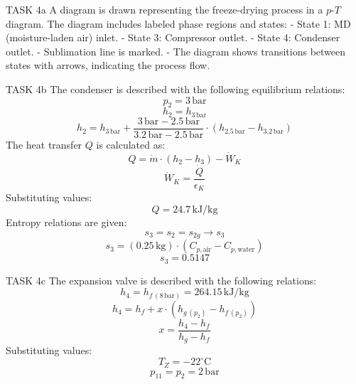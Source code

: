 TASK 4a  
A diagram is drawn representing the freeze-drying process in a \( p \)-\( T \) diagram. The diagram includes labeled phase regions and states:  
- State 1: MD (moisture-laden air) inlet.  
- State 3: Compressor outlet.  
- State 4: Condenser outlet.  
- Sublimation line is marked.  
- The diagram shows transitions between states with arrows, indicating the process flow.  

TASK 4b  
The condenser is described with the following equilibrium relations:  
\[
p_2 = 3 \, \text{bar}
\]
\[
h_2 = h_{3 \, \text{bar}}
\]
\[
h_2 = h_{3 \, \text{bar}} + \frac{3 \, \text{bar} - 2.5 \, \text{bar}}{3.2 \, \text{bar} - 2.5 \, \text{bar}} \cdot (h_{2.5 \, \text{bar}} - h_{3.2 \, \text{bar}})
\]
The heat transfer \( Q \) is calculated as:  
\[
Q = \dot{m} \cdot (h_2 - h_3) - \dot{W}_K
\]
\[
\dot{W}_K = \frac{\dot{Q}}{\epsilon_K}
\]
Substituting values:  
\[
Q = 24.7 \, \text{kJ/kg}
\]
Entropy relations are given:  
\[
s_3 = s_2 = s_{2g} \rightarrow s_3
\]
\[
s_3 = (0.25 \, \text{kg}) \cdot (C_{p, \text{air}} - C_{p, \text{water}})
\]
\[
s_3 = 0.5147
\]

TASK 4c  
The expansion valve is described with the following relations:  
\[
h_4 = h_{f \, (8 \, \text{bar})} = 264.15 \, \text{kJ/kg}
\]
\[
h_4 = h_{f} + x \cdot (h_{g \, (p_2)} - h_{f \, (p_2)})
\]
\[
x = \frac{h_4 - h_{f}}{h_{g} - h_{f}}
\]
Substituting values:  
\[
T_Z = -22^\circ\text{C}
\]
\[
p_{11} = p_{2} = 2 \, \text{bar}
\]